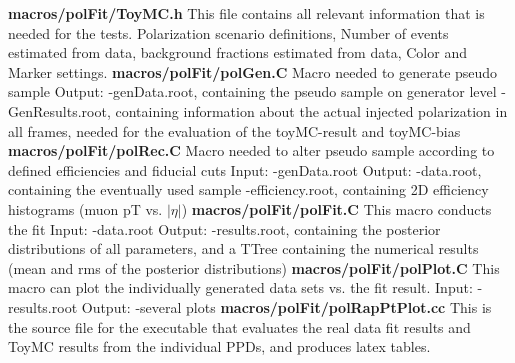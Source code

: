 \documentclass{article}
\begin{document}
{\bf macros/polFit/ToyMC.h}
This file contains all relevant information that is needed for the tests. Polarization scenario
definitions, Number of events estimated from data, background fractions estimated from data,
Color and Marker settings.
\newline
\newline
{\bf macros/polFit/polGen.C}
Macro needed to generate pseudo sample 
\newline Output:
\newline-genData.root, containing the pseudo sample on generator level
\newline-GenResults.root, containing information about the actual injected polarization in all frames,
needed for the evaluation of the toyMC-result and toyMC-bias
\newline
\newline
{\bf macros/polFit/polRec.C}
Macro needed to alter pseudo sample according to defined efficiencies and fiducial cuts
\newline Input:
\newline-genData.root
\newline Output:
\newline-data.root, containing the eventually used sample
\newline-efficiency.root, containing 2D efficiency histograms (muon pT vs. $|\eta|$)
\newline
\newline
{\bf macros/polFit/polFit.C}
This macro conducts the fit 
\newline Input:
\newline-data.root
\newline Output:
\newline-results.root, containing the posterior distributions of all parameters, and a TTree containing the
numerical results (mean and rms of the posterior distributions)
\newline
\newline
{\bf macros/polFit/polPlot.C}
This macro can plot the individually generated data sets vs. the fit result.
\newline Input:
\newline-results.root
\newline Output:
\newline-several plots
\newline
\newline
{\bf macros/polFit/polRapPtPlot.cc}
This is the source file for the executable that evaluates the real data fit results and ToyMC results from the individual PPDs, and produces latex tables.
\end{document}
